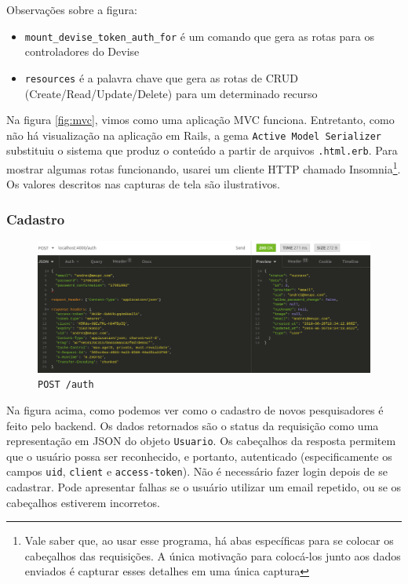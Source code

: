 Observações sobre a figura:
\begin{itemize}
  \item \texttt{mount\_devise\_token\_auth\_for} é um comando que gera as rotas para os controladores do Devise
  \item \texttt{resources} é a palavra chave que gera as rotas de CRUD (Create/Read/Update/Delete) para um determinado
  recurso
\end{itemize}

Na figura \ref{fig:mvc}, vimos como uma aplicação MVC funciona. Entretanto, como não há visualização na aplicação em Rails,
a gema \texttt{Active Model Serializer} substituiu o sistema que produz o conteúdo a partir de arquivos \texttt{.html.erb}.
Para mostrar algumas rotas funcionando, usarei um cliente HTTP chamado Insomnia\footnote{Vale saber que, ao usar esse
programa, há abas específicas para se colocar os cabeçalhos das requisições. A única motivação para colocá-los junto aos
dados enviados é capturar esses detalhes em uma única captura}. Os valores descritos nas capturas de tela são ilustrativos.

\subsubsection{Cadastro}

\begin{figure}[ht]
  \centering
  \includegraphics[width=.75\textwidth]{figuras/sign-up.png}
  \caption{\texttt{POST /auth}}
  \label{fig:sign-up}
\end{figure}

Na figura acima, como podemos ver como o cadastro de novos pesquisadores é feito pelo backend. Os dados retornados são
o status da requisição como uma representação em JSON do objeto \texttt{Usuario}. Os cabeçalhos da resposta permitem que
o usuário possa ser reconhecido, e portanto, autenticado (especificamente os campos \texttt{uid}, \texttt{client} e
\texttt{access-token}). Não é necessário fazer login depois de se cadastrar. Pode apresentar falhas se o usuário utilizar
um email repetido, ou se os cabeçalhos estiverem incorretos.

